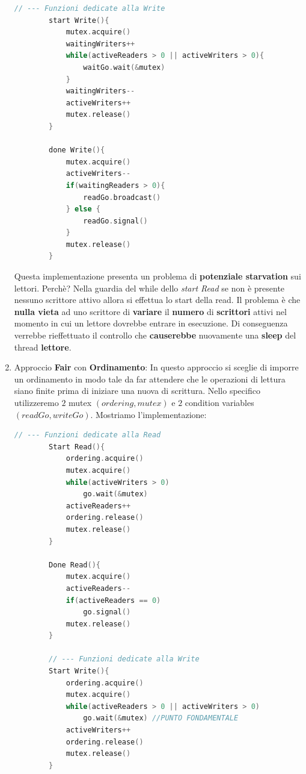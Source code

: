 \documentclass{article}
\begin{document}
\begin{enumerate}
\begin{lstlisting}[language = C]
        // --- Funzioni dedicate alla Write
        start Write(){
            mutex.acquire()
            waitingWriters++
            while(activeReaders > 0 || activeWriters > 0){
                waitGo.wait(&mutex)
            }
            waitingWriters--
            activeWriters++
            mutex.release()
        }

        done Write(){
            mutex.acquire()
            activeWriters--
            if(waitingReaders > 0){
                readGo.broadcast()
            } else {
                readGo.signal()
            }
            mutex.release()
        }

    \end{lstlisting}
    \vspace*{-10px}
    Questa implementazione presenta un problema di \textbf{potenziale starvation} sui lettori. Perchè? Nella guardia del while dello \textit{start Read} se non è
    presente nessuno scrittore attivo allora si effettua lo start della read. Il problema è che \textbf{nulla vieta} ad uno scrittore di \textbf{variare} il \textbf{numero} di \textbf{scrittori} attivi nel momento in cui un lettore dovrebbe entrare in esecuzione. Di conseguenza
    verrebbe rieffettuato il controllo che \textbf{causerebbe} nuovamente una \textbf{sleep} del thread \textbf{lettore}.

\newpage

    \item Approccio \textbf{Fair} con \textbf{Ordinamento}: In questo approccio si sceglie di imporre un ordinamento in modo tale da far attendere che le operazioni di lettura siano finite prima di iniziare una nuova di scrittura.
    Nello specifico utilizzeremo $2$ mutex $(ordering, mutex)$ e $2$ condition variables $(readGo, writeGo)$. Mostriamo l'implementazione:
    \vspace*{8px}
    \begin{lstlisting}[language = C]
        // --- Funzioni dedicate alla Read
        Start Read(){
            ordering.acquire()
            mutex.acquire()
            while(activeWriters > 0)
                go.wait(&mutex)
            activeReaders++
            ordering.release()
            mutex.release()
        }

        Done Read(){
            mutex.acquire()
            activeReaders--
            if(activeReaders == 0)
                go.signal()
            mutex.release()
        }

        // --- Funzioni dedicate alla Write
        Start Write(){
            ordering.acquire()
            mutex.acquire()
            while(activeReaders > 0 || activeWriters > 0)
                go.wait(&mutex) //PUNTO FONDAMENTALE
            activeWriters++
            ordering.release()
            mutex.release()
        }


\end{lstlisting}
\end{enumerate}
\end{document}
